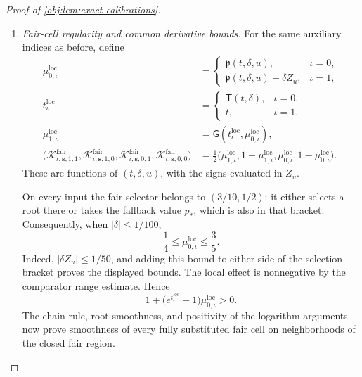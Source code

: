 \documentclass[11pt]{article}
\begin{document}
\begin{proof}[Proof of \cref{obj:lem:exact-calibrations}]
\begin{enumerate}
Apply this first to
\(\varphi(\delta')=\mathfrak p(t,\delta',u)\), and then to
\(\varphi(\delta')=\partial_u\mathfrak p(t,\delta',u)\), with \(t,u\) fixed in their prescribed ranges. Both functions are smooth and even. Their zero-amplitude values are respectively \(p_*\) and \(0\). For the latter value, constancy of
\(\mathfrak p(t,0,u)=p_*\) on \([0,1]\) forces the spatial derivative to vanish also at \(u=0,1\): the available two-sided derivative equals the zero one-sided derivative from the interval. Therefore
\[
|\mathfrak p(t,\delta,u)-p_*|
\le B_{\mathrm{quad}}\delta^2,
\qquad
|\partial_u\mathfrak p(t,\delta,u)|
\le B_{\mathrm{quad}}\delta^2,
\]
and hence
\[
|\mathfrak p(t,\delta,u)-p_*|
+|\partial_u\mathfrak p(t,\delta,u)|
\le M\delta^2
\quad\hbox{on }\mathcal P_{\mathrm{fair}}(\varepsilon_0).
\]

\item \emph{Fair-cell regularity and common derivative bounds.}
For the same auxiliary indices as before, define
\[
\begin{aligned}
\mu^{\mathrm{loc}}_{0,\iota}
&=
\begin{cases}
\mathfrak p(t,\delta,u),&\iota=0,\\
\mathfrak p(t,\delta,u)+\delta Z_u,&\iota=1,
\end{cases}\\
t^{\mathrm{loc}}_\iota
&=
\begin{cases}
\mathsf T(t,\delta),&\iota=0,\\
t,&\iota=1,
\end{cases}\\
\mu^{\mathrm{loc}}_{1,\iota}
&=\mathsf G(t^{\mathrm{loc}}_\iota,\mu^{\mathrm{loc}}_{0,\iota}),\\
\bigl(
\mathcal K^{\mathrm{fair}}_{\iota,\boldsymbol{s},1,1},
\mathcal K^{\mathrm{fair}}_{\iota,\boldsymbol{s},1,0},
\mathcal K^{\mathrm{fair}}_{\iota,\boldsymbol{s},0,1},
\mathcal K^{\mathrm{fair}}_{\iota,\boldsymbol{s},0,0}
\bigr)
&=
\frac12\bigl(
\mu^{\mathrm{loc}}_{1,\iota},
1-\mu^{\mathrm{loc}}_{1,\iota},
\mu^{\mathrm{loc}}_{0,\iota},
1-\mu^{\mathrm{loc}}_{0,\iota}
\bigr).
\end{aligned}
\]
These are functions of \((t,\delta,u)\), with the signs evaluated in \(Z_u\).

On every input the fair selector belongs to \((3/10,1/2)\): it either selects a root there or takes the fallback value \(p_*\), which is also in that bracket. Consequently, when \(|\delta|\le1/100\),
\[
\frac14\le\mu^{\mathrm{loc}}_{0,\iota}\le\frac35.
\]
Indeed, \(|\delta Z_u|\le1/50\), and adding this bound to either side of the selection bracket proves the displayed bounds. The local effect is nonnegative by the comparator range estimate. Hence
\[
1+\bigl(e^{t^{\mathrm{loc}}_\iota}-1\bigr)
\mu^{\mathrm{loc}}_{0,\iota}>0.
\]
The chain rule, root smoothness, and positivity of the logarithm arguments now prove smoothness of every fully substituted fair cell on neighborhoods of the closed fair region.


\end{enumerate}
\end{proof}
\end{document}
